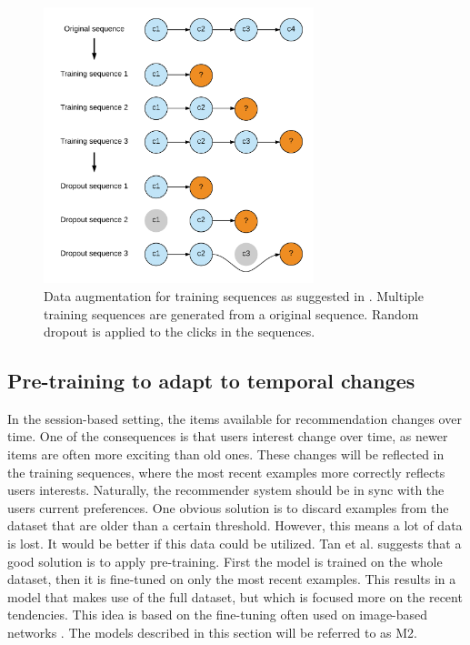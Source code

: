 \begin{figure}[htp]
	\centering
	\includegraphics[width=0.7\textwidth]{fig/sequence-augmentation.png}
	\caption{Data augmentation for training sequences as suggested in \cite{DBLP:journals/corr/TanXL16}. Multiple training sequences are generated from a original sequence. Random dropout is applied to the clicks in the sequences.}
	\label{fig:sequence-augmentation}
\end{figure}

\subsection{Pre-training to adapt to temporal changes}
In the session-based setting, the items available for recommendation changes over time. One of the consequences is that users interest change over time, as newer items are often more exciting than old ones. These changes will be reflected in the training sequences, where the most recent examples more correctly reflects users interests. Naturally, the recommender system should be in sync with the users current preferences. One obvious solution is to discard examples from the dataset that are older than a certain threshold. However, this means a lot of data is lost. It would be better if this data could be utilized. Tan et al. suggests that a good solution is to apply pre-training. First the model is trained on the whole dataset, then it is fine-tuned on only the most recent examples. This results in a model that makes use of the full dataset, but which is focused more on the recent tendencies. This idea is based on the fine-tuning often used on image-based networks \cite{DBLP:journals/corr/ChatfieldSVZ14}. The models described in this section will be referred to as M2.


